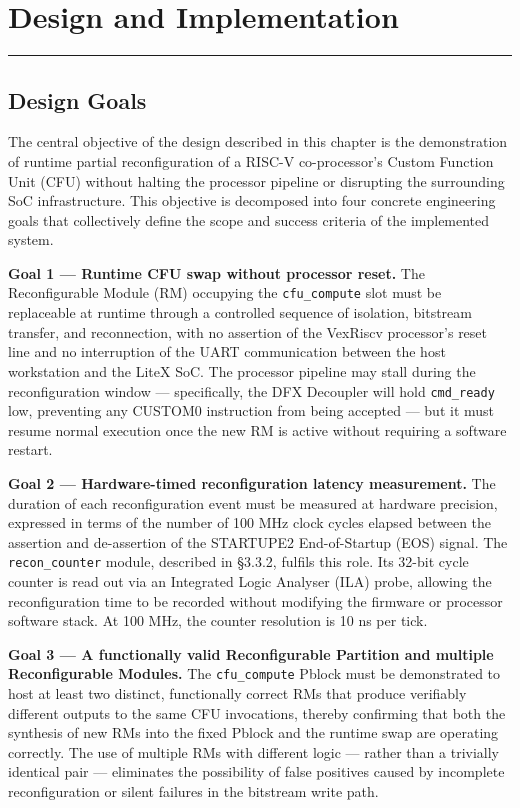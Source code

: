 \chapter{Design and Implementation}

\vspace{0.4em}\hrule\vspace{0.4em}

\section{Design Goals}

The central objective of the design described in this chapter is the demonstration of runtime partial reconfiguration of a RISC-V co-processor's Custom Function Unit (CFU) without halting the processor pipeline or disrupting the surrounding SoC infrastructure. This objective is decomposed into four concrete engineering goals that collectively define the scope and success criteria of the implemented system.

\textbf{Goal 1 — Runtime CFU swap without processor reset.} The Reconfigurable Module (RM) occupying the \texttt{cfu\_compute} slot must be replaceable at runtime through a controlled sequence of isolation, bitstream transfer, and reconnection, with no assertion of the VexRiscv processor's reset line and no interruption of the UART communication between the host workstation and the LiteX SoC. The processor pipeline may stall during the reconfiguration window — specifically, the DFX Decoupler will hold \texttt{cmd\_ready} low, preventing any CUSTOM0 instruction from being accepted — but it must resume normal execution once the new RM is active without requiring a software restart.

\textbf{Goal 2 — Hardware-timed reconfiguration latency measurement.} The duration of each reconfiguration event must be measured at hardware precision, expressed in terms of the number of 100 MHz clock cycles elapsed between the assertion and de-assertion of the STARTUPE2 End-of-Startup (EOS) signal. The \texttt{recon\_counter} module, described in §3.3.2, fulfils this role. Its 32-bit cycle counter is read out via an Integrated Logic Analyser (ILA) probe, allowing the reconfiguration time to be recorded without modifying the firmware or processor software stack. At 100 MHz, the counter resolution is 10 ns per tick.

\textbf{Goal 3 — A functionally valid Reconfigurable Partition and multiple Reconfigurable Modules.} The \texttt{cfu\_compute} Pblock must be demonstrated to host at least two distinct, functionally correct RMs that produce verifiably different outputs to the same CFU invocations, thereby confirming that both the synthesis of new RMs into the fixed Pblock and the runtime swap are operating correctly. The use of multiple RMs with different logic — rather than a trivially identical pair — eliminates the possibility of false positives caused by incomplete reconfiguration or silent failures in the bitstream write path.


